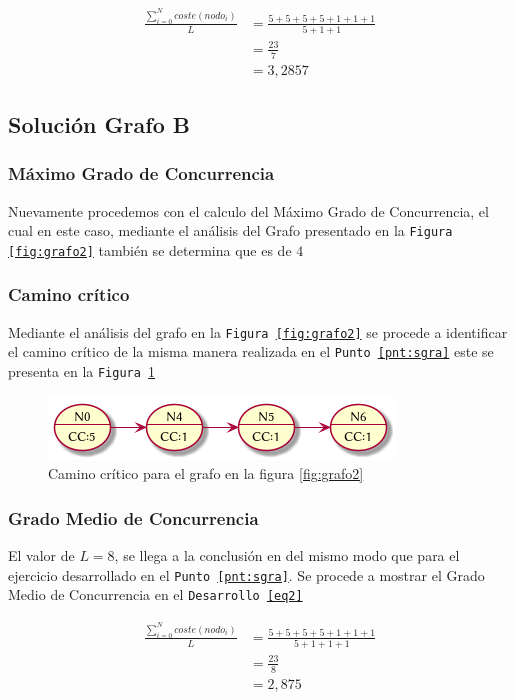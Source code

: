 \documentclass{article}
\begin{document}
\begin{equation} \label{eq1}
\begin{split}
\frac{\sum_{i=0}^{N} coste(nodo_{i})}{L} & =  \frac{5 + 5 + 5 + 5 + 1 + 1 + 1}{5 + 1 + 1} \\
 & = \frac{23}{7} \\
 & = 3,2857
\end{split}
\end{equation}

\subsection{Soluci\'on Grafo B}
\subsubsection{M\'aximo Grado de Concurrencia}
Nuevamente procedemos con el calculo del M\'aximo Grado de Concurrencia, el cual en este
caso, mediante el an\'alisis del Grafo presentado en la \texttt{Figura
\ref{fig:grafo2}} tambi\'en se determina que es de $4$

\subsubsection{Camino cr\'itico}
Mediante el an\'alisis del grafo en la \texttt{Figura
\ref{fig:grafo2}} se procede a identificar el camino cr\'itico de la misma manera
realizada en el \texttt{Punto \ref{pnt:sgra}} este se presenta en la
\texttt{Figura \ref{fig:cc2}}
\begin{figure}[H]
  \centering
  \includegraphics[width=.4\linewidth]{grafo2_cc}
  \caption{Camino cr\'itico para el grafo en la figura \ref{fig:grafo2}}
  \label{fig:cc2}
\end{figure}

\subsubsection{Grado Medio de Concurrencia}
El valor de $L=8$, se llega a la conclusi\'on en del mismo modo que para el
ejercicio desarrollado en el \texttt{Punto \ref{pnt:sgra}}. Se procede a mostrar
el Grado Medio de Concurrencia en el \texttt{Desarrollo \ref{eq2}}

\begin{equation} \label{eq2}
\begin{split}
\frac{\sum_{i=0}^{N} coste(nodo_{i})}{L} & =  \frac{5 + 5 + 5 + 5 + 1 + 1 +
1}{5 + 1 + 1 + 1} \\
 & = \frac{23}{8} \\
 & = 2,875
\end{split}
\end{equation}
\end{document}
